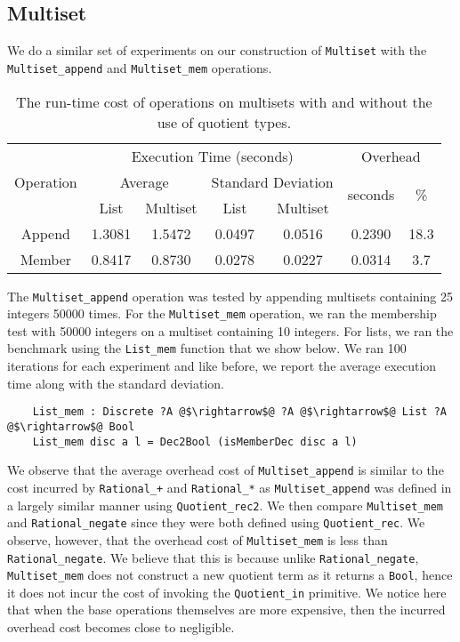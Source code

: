 \documentclass[12pt,twoside,maitrise]{dms}
\theoremstyle{definition}
\numberwithin{equation}{section}
\numberwithin{table}{chapter}
\numberwithin{figure}{chapter}
\newcommand\id[1] {\texttt{#1}}
\begin{document}
\subsection*{Multiset}

We do a similar set of experiments on our construction of \id{Multiset} with the
\id{Multiset\_append} and \id{Multiset\_mem} operations.

\begin{table}[]
\centering
\begin{tabular}{@{}ccccccc@{}}
\toprule
\multirow{3}{*}{Operation} & \multicolumn{4}{c}{Execution Time (seconds)}                         & \multicolumn{2}{c}{Overhead}                   \\ \cmidrule(l){2-7}
                           & \multicolumn{2}{c}{Average} & \multicolumn{2}{c}{Standard Deviation} & \multirow{2}{*}{seconds} & \multirow{2}{*}{\%} \\
       & List   & Multiset & List   & Multiset &        &      \\ \midrule
Append & 1.3081 & 1.5472   & 0.0497 & 0.0516   & 0.2390 & 18.3 \\
Member & 0.8417 & 0.8730   & 0.0278 & 0.0227   & 0.0314 & 3.7  \\ \bottomrule
\end{tabular}
\caption{The run-time cost of operations on multisets with and without the use of quotient types.}\label{tab:benchmark-multiset}
\end{table}

The \id{Multiset\_append} operation was tested by appending multisets containing
25 integers 50000 times. For the \id{Multiset\_mem} operation, we ran the
membership test with 50000 integers on a multiset containing 10 integers. For
lists, we ran the benchmark using the \id{List\_mem} function that we show
below. We ran 100 iterations for each experiment and like before, we report the
average execution time along with the standard deviation.

\begin{verbatim}
    List_mem : Discrete ?A @$\rightarrow$@ ?A @$\rightarrow$@ List ?A @$\rightarrow$@ Bool
    List_mem disc a l = Dec2Bool (isMemberDec disc a l)
\end{verbatim}

We observe that the average overhead cost of \id{Multiset\_append} is similar to
the cost incurred by \id{Rational\_+} and \id{Rational\_*} as
\id{Multiset\_append} was defined in a largely similar manner using
\id{Quotient\_rec2}. We then compare \id{Multiset\_mem} and
\id{Rational\_negate} since they were both defined using \id{Quotient\_rec}. We
observe, however, that the overhead cost of \id{Multiset\_mem} is less than
\id{Rational\_negate}. We believe that this is because unlike
\id{Rational\_negate}, \id{Multiset\_mem} does not construct a new quotient term
as it returns a \id{Bool}, hence it does not incur the cost of invoking the
\id{Quotient\_in} primitive. We notice here that when the base operations
themselves are more expensive, then the incurred overhead cost becomes close to
negligible.
\end{document}
